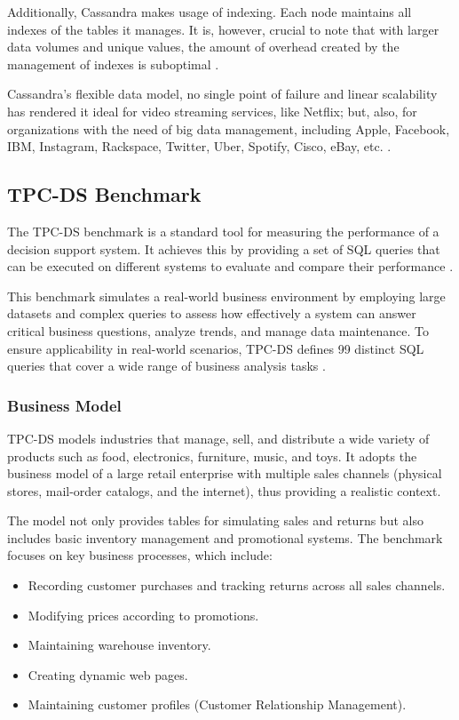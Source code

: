 \documentclass[conference]{IEEEtran}
\begin{document}
Additionally, Cassandra makes usage of indexing. Each node maintains all indexes of the tables it manages. It is, however, crucial to note that with larger data volumes and unique values, the amount of overhead created by the management of indexes is suboptimal \cite{b11}.

Cassandra’s flexible data model, no single point of failure and linear scalability has rendered it ideal for video streaming services, like Netflix; but, also, for organizations with the need of big data management, including Apple, Facebook, IBM, Instagram, Rackspace, Twitter, Uber, Spotify, Cisco, eBay, etc. \cite{b17}.



\subsection{TPC-DS Benchmark}\label{tpcds}

The TPC-DS benchmark is a standard tool for measuring the performance of a decision support system. It achieves this by providing a set of SQL queries that can be executed on different systems to evaluate and compare their performance \cite{b5}.

This benchmark simulates a real-world business environment by employing large datasets and complex queries to assess how effectively a system can answer critical business questions, analyze trends, and manage data maintenance. To ensure applicability in real-world scenarios, TPC-DS defines 99 distinct SQL queries that cover a wide range of business analysis tasks \cite{b6}.

\subsubsection{Business Model}

TPC-DS models industries that manage, sell, and distribute a wide variety of products such as food, electronics, furniture, music, and toys. It adopts the business model of a large retail enterprise with multiple sales channels (physical stores, mail-order catalogs, and the internet), thus providing a realistic context.

The model not only provides tables for simulating sales and returns but also includes basic inventory management and promotional systems. The benchmark focuses on key business processes, which include:
\begin{itemize}
    \item Recording customer purchases and tracking returns across all sales channels.
    \item Modifying prices according to promotions.
    \item Maintaining warehouse inventory.
    \item Creating dynamic web pages.
    \item Maintaining customer profiles (Customer Relationship Management).
\end{itemize}
\end{document}
